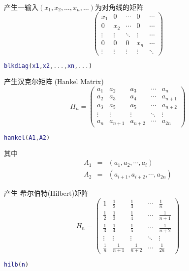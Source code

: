 \documentclass{ctexart}
\begin{document}
  产生一输入$(x_1,x_2,\dots,x_n,\dots)$为对角线的矩阵
  $$\left(\begin{array}{ccccc}
  x_1    & 0      & \cdots & 0      & \cdots \\
  0      & x_2    & \cdots & 0      & \cdots \\
  \vdots & \vdots & \ddots & \vdots & \cdots \\
  0      & 0      & 0      & x_n    & \cdots \\
  \vdots & \vdots & \vdots & \vdots & \ddots
  \end{array}\right)$$
  \begin{lstlisting}[language=matlab]
  blkdiag(x1,x2,...,xn,...)
  \end{lstlisting}
  产生汉克尔矩阵 (Hankel Matrix)
  $$H_n=\left(\begin{array}{ccccc}
  a_1    & a_2     & a_3      & \cdots & a_n     \\
  a_2    & a_3     & a_4      & \cdots & a_{n+1} \\
  a_3    & a_5     & a_5      & \cdots & a_{n+2} \\
  \vdots & \vdots  & \vdots   & \ddots & \vdots  \\
  a_n    & a_{n+1} & a_{n+2}  & \cdots & a_{2n}
  \end{array}\right)$$
  \begin{lstlisting}[language=matlab]
  hankel(A1,A2)
  \end{lstlisting}
  其中
  \begin{eqnarray*}
  A_1 &=& (a_1,a_2,\cdots,a_i) \\
  A_2 &=& (a_{i+1},a_{i+2},\cdots,a_{2n})
  \end{eqnarray*}

  产生 希尔伯特(Hilbert)矩阵
  $$H_n=\left(\begin{array}{ccccc}
  1           & \frac{1}{2}   & \frac{1}{3}   & \cdots & \frac{1}{n}   \\
  \frac{1}{2} & \frac{1}{3}   & \frac{1}{4}   & \cdots & \frac{1}{n+1} \\
  \frac{1}{3} & \frac{1}{4}   & \frac{1}{5}   & \cdots & \frac{1}{n+2} \\
  \vdots      & \vdots        & \vdots        & \ddots & \vdots        \\
  \frac{1}{n} & \frac{1}{n+1} & \frac{1}{n+2} & \cdots & \frac{1}{2n}
  \end{array}\right)$$
  \begin{lstlisting}[language=matlab]
  hilb(n)
  \end{lstlisting}
\end{document}
